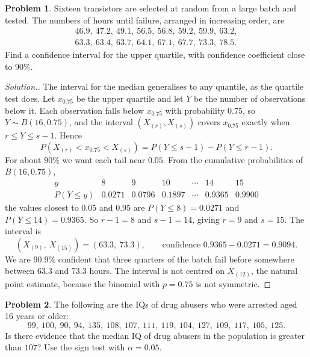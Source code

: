 \documentclass[11pt,a4paper]{article}
\theoremstyle{definition}
\newtheorem{problemx}{Problem}[section]
\newenvironment{problem}{\begin{problemx}}{\end{problemx}}
\newenvironment{solution}
  {\renewcommand{\qedsymbol}{}\begin{proof}[\textit{Solution}.]}
  {\end{proof}}
\begin{document}
\begin{problem}
Sixteen transistors are selected at random from a large batch and tested. The numbers
of hours until failure, arranged in increasing order, are
\begin{gather*}
46.9,\ 47.2,\ 49.1,\ 56.5,\ 56.8,\ 59.2,\ 59.9,\ 63.2,\\
63.3,\ 63.4,\ 63.7,\ 64.1,\ 67.1,\ 67.7,\ 73.3,\ 78.5.
\end{gather*}
Find a confidence interval for the upper quartile, with confidence coefficient close to
$90\%$.
\end{problem}

\begin{solution}
The interval for the median generalises to any quantile, as the quartile test does.
Let $x_{0.75}$ be the upper quartile and let $Y$ be the number of observations below
it. Each observation falls below $x_{0.75}$ with probability $0.75$, so
$Y\sim B(16, 0.75)$, and the interval $\left(X_{(r)}, X_{(s)}\right)$ covers $x_{0.75}$
exactly when $r\leq Y\leq s-1$. Hence
\[P\left(X_{(r)} < x_{0.75} < X_{(s)}\right) = P(Y\leq s-1)-P(Y\leq r-1).\]
For about $90\%$ we want each tail near $0.05$. From the cumulative probabilities of
$B(16, 0.75)$,
\[\begin{array}{c|cccccc}
y & 8 & 9 & 10 & \cdots & 14 & 15\\\hline
P(Y\leq y) & 0.0271 & 0.0796 & 0.1897 & \cdots & 0.9365 & 0.9900
\end{array}\]
the values closest to $0.05$ and $0.95$ are $P(Y\leq 8) = 0.0271$ and
$P(Y\leq 14) = 0.9365$. So $r-1 = 8$ and $s-1 = 14$, giving $r = 9$ and $s = 15$. The
interval is
\[\left(X_{(9)},\ X_{(15)}\right) = (63.3,\ 73.3),\qquad
\text{confidence } 0.9365-0.0271 = 0.9094.\]
We are $90.9\%$ confident that three quarters of the batch fail before somewhere between
$63.3$ and $73.3$ hours. The interval is not centred on $X_{(12)}$, the natural point
estimate, because the binomial with $p = 0.75$ is not symmetric.
\end{solution}

\begin{problem}
The following are the IQs of drug abusers who were arrested aged 16 years or older:
\[99,\ 100,\ 90,\ 94,\ 135,\ 108,\ 107,\ 111,\ 119,\ 104,\ 127,\ 109,\ 117,\ 105,\ 125.\]
Is there evidence that the median IQ of drug abusers in the population is greater than
$107$? Use the sign test with $\alpha = 0.05$.
\end{problem}
\end{document}
